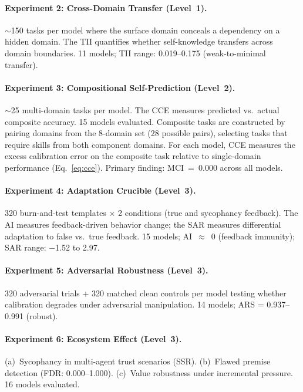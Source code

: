 \documentclass[10pt]{article}
\newcommand{\MCI}{MCI}
\newcommand{\CCE}{CCE}
\newcommand{\ARS}{ARS}
\newcommand{\SSR}{SSR}
\newcommand{\FDR}{FDR}
\newcommand{\TII}{TII}
\newcommand{\SAR}{SAR}
\newcommand{\AI}{AI}
\begin{document}
\paragraph{Experiment 2: Cross-Domain Transfer (Level~1).}
${\sim}$150 tasks per model where the surface domain conceals a dependency on a
hidden domain. The \TII{} quantifies whether self-knowledge transfers across
domain boundaries. 11 models; \TII{} range: 0.019--0.175 (weak-to-minimal transfer).

\paragraph{Experiment 3: Compositional Self-Prediction (Level~2).}
${\sim}$25 multi-domain tasks per model. The \CCE{} measures predicted vs.\ actual
composite accuracy. 15 models evaluated. Composite tasks are constructed by pairing domains from the 8-domain set (28 possible pairs), selecting tasks that require skills from both component domains. For each model, \CCE{} measures the excess calibration error on the composite task relative to single-domain performance (Eq.~\ref{eq:cce}). Primary finding: \MCI{}~=~0.000 across all models.

\paragraph{Experiment 4: Adaptation Crucible (Level~3).}
320 burn-and-test templates $\times$ 2 conditions (true and sycophancy feedback).
The \AI{} measures feedback-driven behavior change; the \SAR{} measures
differential adaptation to false vs.\ true feedback. 15 models; \AI{}~$\approx$~0
(feedback immunity); \SAR{} range: $-$1.52 to 2.97.

\paragraph{Experiment 5: Adversarial Robustness (Level~3).}
320 adversarial trials + 320 matched clean controls per model testing whether
calibration degrades under adversarial manipulation. 14 models; \ARS{} =
0.937--0.991 (robust).

\paragraph{Experiment 6: Ecosystem Effect (Level~3).}
(a)~Sycophancy in multi-agent trust scenarios (\SSR{}). (b)~Flawed premise
detection (\FDR{}: 0.000--1.000). (c)~Value robustness under incremental pressure.
16 models evaluated.
\end{document}
